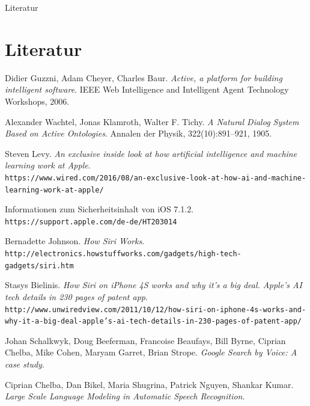 \documentclass[18pt]{beamer}
\begin{document}
\begin{frame}[allowframebreaks]{Literatur}

	
	
	\section{Literatur}
	\begin{thebibliography}{9}
		
		Didier Guzzni, Adam Cheyer, Charles Baur. 
		\textit{Active, a platform for building intelligent software}. 
		IEEE Web Intelligence and Intelligent Agent Technology Workshops, 2006.
		
		Alexander Wachtel, Jonas Klamroth, Walter F. Tichy. 
		\textit{A Natural Dialog System Based on Active Ontologies}.
		Annalen der Physik, 322(10):891–921, 1905.
		
		Steven Levy.
		\textit{An exclusive inside look at how artificial intelligence and machine learning work at Apple}.
		\\\texttt{https://www.wired.com/2016/08/an-exclusive-look-at-how-ai-and-machine-learning-work-at-apple/}
		
		Informationen zum Sicherheitsinhalt von iOS 7.1.2.
		\\\texttt{https://support.apple.com/de-de/HT203014}
		
		Bernadette Johnson.
		\textit{How Siri Works}.
		\\\texttt{http://electronics.howstuffworks.com/gadgets/high-tech-gadgets/siri.htm}
		
		Stasys Bielinis.
		\textit{How Siri on iPhone 4S works and why it’s a big deal. Apple’s AI tech details in 230 pages of patent app}.
		\\\texttt{http://www.unwiredview.com/2011/10/12/how-siri-on-iphone-4s-works-and-why-it-a-big-deal-apple's-ai-tech-details-in-230-pages-of-patent-app/}
		
		Johan Schalkwyk, Doug Beeferman, Francoise Beaufays, Bill Byrne, Ciprian Chelba, Mike Cohen, Maryam Garret, Brian Strope. 
		\textit{Google Search by Voice: A case study}. 
		
		Ciprian Chelba, Dan Bikel, Maria Shugrina, Patrick Nguyen, Shankar Kumar. 
		\textit{Large Scale Language Modeling in Automatic Speech Recognition}. 
		

\end{thebibliography}
\end{frame}
\end{document}
